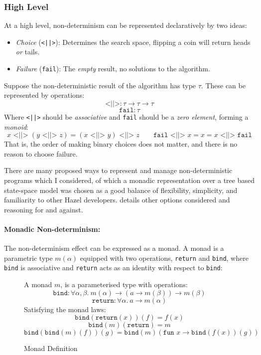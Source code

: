 \subsubsection{High Level}
At a high level, non-determinism can be represented declaratively by two ideas:
\begin{itemize}
\item \textit{Choice} (\texttt{<||>}): Determines the search space, flipping a coin will return heads \textit{or} tails.
\item \textit{Failure} (\texttt{fail}): The \textit{empty} result, no solutions to the algorithm.
\end{itemize}
Suppose the non-deterministic result of the algorithm has type $\tau$. These can be represented by operations:
\[\texttt{<||>} : \tau \to \tau \to \tau\]
\[\texttt{fail} : \tau\]
Where \texttt{<||>} should be \textit{associative} and \texttt{fail} should be a \textit{zero element}, forming a \textit{monoid}:
\[x \texttt{ <||> } (y \texttt{ <||> } z) = (x \texttt{ <||> } y) \texttt{ <||> } z \qquad \texttt{fail} \texttt{ <||> } x = x = x \texttt{ <||> } \texttt{fail}\]
That is, the order of making binary choices does not matter, and there is no reason to choose failure.

There are many proposed ways to represent and manage non-deterministic programs which I considered, of which a monadic representation over a tree based state-space model was chosen as a good balance of flexibility, simplicity, and familiarity to other Hazel developers.  details other options considered and reasoning for and against.  

\paragraph{Monadic Non-determinism:} The non-determinism effect can be expressed as a monad. A monad is a parametric type $m(\alpha)$ equipped with two operations, \texttt{return} and \texttt{bind}, where \texttt{bind} is associative and \texttt{return} acts as an identity with respect to \texttt{bind}:
\begin{figure}[H]
A monad $m$, is a parameterised type with operations:
\[\texttt{bind} : \forall \alpha, \beta.\ m(\alpha) \to (a \to m(\beta)) \to m(\beta)\]
\[\texttt{return} : \forall \alpha.\ a \to m(\alpha)\]
Satisfying the monad laws:
\[\texttt{bind}(\texttt{return}(x))(f) = f(x)\]
\[\texttt{bind}(m)(\texttt{return}) = m\]
\[\texttt{bind}(\texttt{bind}(m)(f))(g) = \texttt{bind}(m)(\texttt{fun } x \to \texttt{bind}(f(x))(g))\]
\caption{Monad Definition}
\end{figure}

